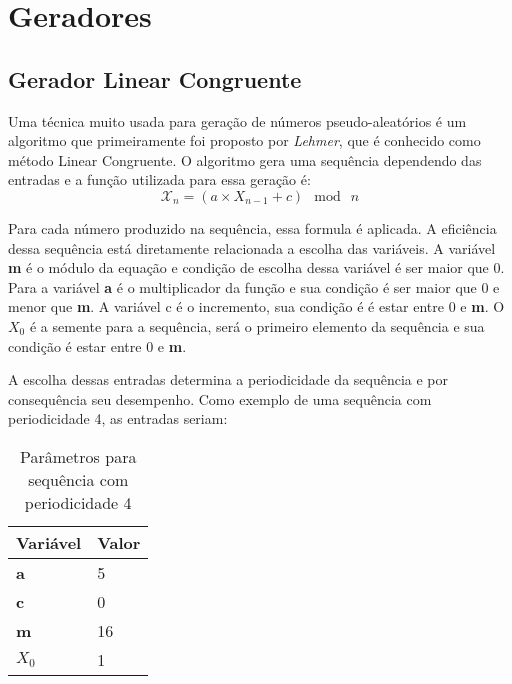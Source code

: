 

\section{Geradores}
\subsection{Gerador Linear Congruente}

Uma técnica muito usada para geração de números pseudo-aleatórios é um algoritmo que primeiramente foi proposto por \textit{Lehmer}, que é conhecido como método Linear Congruente. \cite{william-stallings} O algoritmo gera uma sequência dependendo das entradas e a função utilizada para essa geração é:
\begin{equation}
	\label{Função para geração de números aleatórios.}
	\mathcal{X}_n = (a \times X_{n - 1} + c)\: \bmod \: n
\end{equation}

Para cada número produzido na sequência, essa formula é aplicada. A eficiência dessa sequência está diretamente relacionada a escolha das variáveis. A variável \textbf{m} é o módulo da equação e condição de escolha dessa variável é ser maior que 0. Para a variável \textbf{a} é o multiplicador da função e sua condição é ser maior que 0 e menor que \textbf{m}. A variável c é o incremento, sua condição é é estar entre 0 e \textbf{m}. O \textbf{$X_0$} é a semente para a sequência, será o primeiro elemento da sequência e sua condição é estar entre 0 e \textbf{m}.

A escolha dessas entradas determina a periodicidade da sequência e por consequência seu desempenho. Como exemplo de uma sequência com periodicidade 4, as entradas seriam:

\begin{table}[h]
	\centering
	\begin{tabular}{|l|l|}	
	\hline
		Variável & Valor \\ \hline
		\textbf{a} & 5 \\ \hline
		\textbf{c} & 0 \\ \hline
		\textbf{m} & 16 \\ \hline
		\textbf{$X_0$} & 1 \\ \hline
	\end{tabular}
	\caption{Parâmetros para sequência com periodicidade 4}
\end{table}

